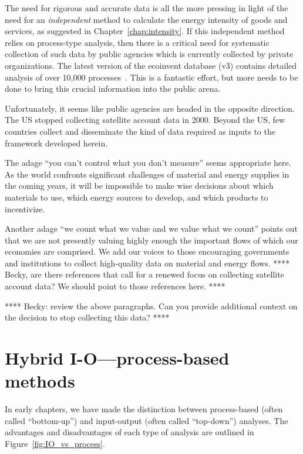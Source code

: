 The need for rigorous and accurate data
is all the more pressing in light of the need for
an \emph{independent} method to calculate
the energy intensity of goods and services,
as suggested in Chapter~\ref{chap:intensity}.
If this independent method relies on process-type
analysis,
then there is a critical need for systematic
collection of such data by public agencies
which is currently collected by private organizations.
The latest version of the ecoinvent database (v3)
contains detailed analysis of over 10,000 
processes~\cite{EcoInvent2012}.
This is a fantastic effort, but more needs to be
done to bring this crucial information into the public arena.

Unfortunately, it seems like public agencies are headed in the
opposite direction.
The US stopped collecting 
satellite account data in 2000. 
Beyond the US, few countries collect and disseminate
the kind of data required as inputs to the framework
developed herein.

The adage ``you can't control what you don't measure''
seems appropriate here. 
As the world confronts significant challenges
of material and energy supplies in the coming years,
it will be impossible to make wise decisions about
which materials to use,
which energy sources to develop, and 
which products to incentivize.

Another adage ``we count what we value and we value what we count''
points out that we are not presently valuing highly enough
the important flows of which our economies are comprised.
We add our voices to those encouraging governments and 
institutions to collect high-quality data on material 
and energy flows.
**** Becky, are there references that call for a renewed focus on 
collecting satellite account data? 
We should point to those references here. ****
 
**** Becky: review the above paragraphs.
Can you provide additional context on the decision
to stop collecting this data? ****

\section{Hybrid I-O---process-based methods}
\label{sec:hybrid}

In early chapters,
we have made the distinction between
process-based (often called ``bottom-up'') 
and input-output (often called ``top-down'')
analyses.
The advantages and disadvantages of each type
of analysis are outlined in Figure~\ref{fig:IO_vs_process}.

